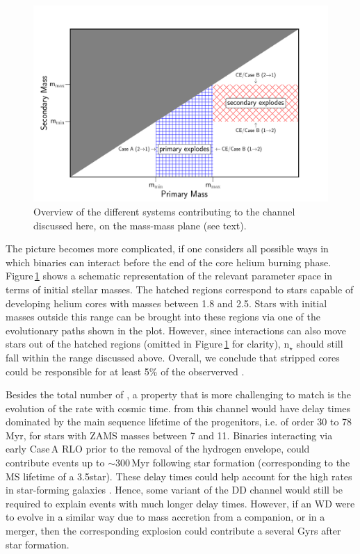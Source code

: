 \documentclass{aa}
\begin{document}
\begin{figure}[htb!]
\begin{center}
\includegraphics[width=1\textwidth]{rates.pdf}
\caption{Overview of the different systems contributing to the \ia channel discussed here, on the mass-mass plane (see text).}
\label{fig:rates}
\end{center}
\end{figure}

The picture becomes more complicated, if one considers all  possible ways in which binaries can interact before the end of the core helium burning phase. Figure\,\ref{fig:rates} shows a schematic representation of the relevant parameter space in terms of  initial stellar masses. The hatched regions correspond to stars capable of developing helium cores with masses between 1.8 and 2.5\msun. Stars with initial masses outside this range can be brought into these regions via one of the evolutionary paths shown in the plot. However, since interactions can also move stars out of the hatched regions (omitted in Figure\,\ref{fig:rates} for clarity), n$_\star$ should still fall within the range discussed above.   
Overall, we conclude that stripped \one cores could be responsible for at least 5\% of the observerved \ias. 

Besides the total number of \ias, a property that is more challenging to match is the evolution of the \ia rate with cosmic time. \ias from this channel would have delay times dominated by the main sequence lifetime of the progenitors, i.e. of order 30 to 78\,Myr, for stars with ZAMS masses between 7 and 11\msun. Binaries interacting via early Case\,A RLO prior to the removal of the hydrogen envelope, could contribute events up to $\sim 300$\,Myr following star formation (corresponding to the MS lifetime of a 3.5\msun star). 
These delay times could help account for the high \ia rates in star-forming galaxies \citep{Maoz:2010pz,claeys2014}. 
Hence, some variant of the DD channel would still be required to explain events with much longer delay times.  
However, if an \one WD  were to evolve in a similar way due to mass accretion from a companion, or in a merger, then the corresponding explosion could contribute a \ia several Gyrs after star formation. 
\end{document}
